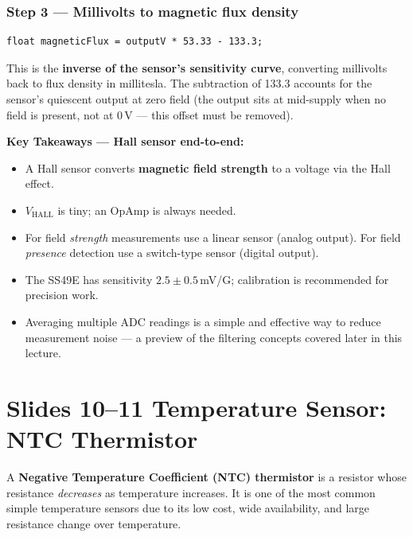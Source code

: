 \documentclass[12pt, a4paper]{article}
\begin{document}
\subsubsection*{Step 3 --- Millivolts to magnetic flux density}
\begin{verbatim}
float magneticFlux = outputV * 53.33 - 133.3;
\end{verbatim}

This is the \textbf{inverse of the sensor's sensitivity curve},
converting millivolts back to flux density in millitesla.
The subtraction of 133.3 accounts for the sensor's quiescent output
at zero field (the output sits at mid-supply when no field is present,
not at 0\,V --- this offset must be removed).

\begin{keybox}
  \textbf{Key Takeaways --- Hall sensor end-to-end:}
  \begin{itemize}[leftmargin=1.5em, topsep=2pt]
    \item A Hall sensor converts \textbf{magnetic field strength} to a
          voltage via the Hall effect.
    \item $V_\mathrm{HALL}$ is tiny; an OpAmp is always needed.
    \item For field \emph{strength} measurements use a linear sensor
          (analog output). For field \emph{presence} detection use a
          switch-type sensor (digital output).
    \item The SS49E has sensitivity $2.5 \pm 0.5$\,mV/G;
          calibration is recommended for precision work.
    \item Averaging multiple ADC readings is a simple and effective
          way to reduce measurement noise --- a preview of the filtering
          concepts covered later in this lecture.
  \end{itemize}
\end{keybox}

\clearpage
\section*{Slides 10--11 \quad Temperature Sensor: NTC Thermistor}

A \textbf{Negative Temperature Coefficient (NTC) thermistor} is a resistor
whose resistance \emph{decreases} as temperature increases.
It is one of the most common simple temperature sensors due to its low cost,
wide availability, and large resistance change over temperature.
\end{document}
